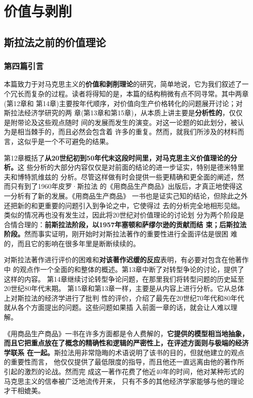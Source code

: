 \part{价值与剥削}

\chapter{斯拉法之前的价值理论}

\section{第四篇引言}

本篇致力于对马克思主义的\textbf{价值和剥削理论}的研究，简单地说，它为我们叙述了一
个冗长而复杂的过程。读者将得知的是，本篇的结构稍微有点不同寻常。其中两章(第12章和
第14章)主要按年代顺序，对价值向生产价格转化的问题展开讨论；对斯拉法经济学研究的两
章(第13章和第15章)，从本质上讲主要是\textbf{分析性的}，仅仅是附带论及这些观点随时
间的发展而发生的演变。对这一论题的如此划分，被认为是相当棘手的，而且必然会包含着
许多的重复。然而，就我们所涉及的材料而言，这似乎是一个不可避免的结果。

第12章概括了\textbf{从20世纪初到50年代末这段时间里，对马克思主义价值理论的分析。}这
些分析的大部分内容仅仅是对前面的结论的进一步证实，特别是德米特里夫和博特凯维兹的
分析。尽管这样做有时会提供一些更精确和更全面的阐述，然而只有到了1960年皮罗·斯拉法
的《用商品生产商品》出版后，才真正地使得这一分析有了新的发展。《用商品生产商品》
一书也是证实己知的结论，但除此之外还把新的和更重要的问题引入到争论之中，它使得过
去的分析完全地相形见绌。类似的情况再也没有发生过，因此将20世纪对价值理论的讨论划
分为两个阶段是合情合理的：\textbf{前斯拉法阶段，以1957年塞顿和萨缪尔逊的贡献而结
  束；后斯拉法阶段。}然而事实证明，刚开始时对斯拉法著作的重要性进行全面评估是很困
难的，而且它的影响在很多年里是断断续续的。

对斯拉法著作进行评价的困难和\textbf{对该著作迟缓的反应}表明，有必要对包含在他著作中
的观点作一个全面的和整体的概述。第13章中断了对转型争论的讨论，提供了这样的内容。
第14章继续讨论转型争论问题，在那里我们将转型问题的历史延至20世纪80年代末期。
第15章和第13章一样，主要是从内容上进行分析。它从总体上对斯拉法的经济学进行了批判
性的评价，介绍了最先在20世纪70年代和80年代就从各个方面提出的问题。这些问题如果插
入前面一章的话，就会让人难以理解。

《用商品生产商品》一书在许多方面都是令人费解的，\textbf{它提供的模型相当地抽象，
  而且它把重点放在了概念的精确性和逻辑的严密性上，在评述方面则与极端的经济学联系
  在一起。}斯拉法用非常隐晦的术语说明了该书的目的，但就他建立的观点的重要性而言，
他仅仅提供了最低限度的指导，而且他还一直远离由他的著作所引起的激烈的论战。然而完
成这一著作花费了他近40年的时间，他对某种形式的马克思主义的信奉被广泛地流传开来，
只有不多的其他经济学家能够与他的理论才干相媲美。

